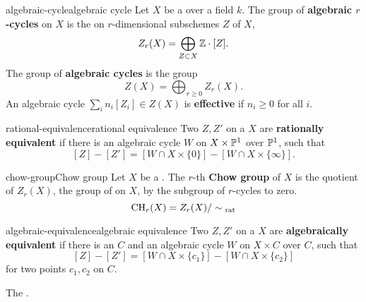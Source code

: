 \begin{topic}{algebraic-cycle}{algebraic cycle}
    Let $X$ be a  over a field $k$. The group of \textbf{algebraic $r$-cycles} on $X$ is the  on $r$-dimensional   subschemes $Z$ of $X$,
    \[ Z_r(X) = \bigoplus_{Z \subset X} \mathbb{Z} \cdot [Z] . \]
    The group of \textbf{algebraic cycles} is the  group
    \[ Z(X) = \bigoplus_{r \ge 0} Z_r(X) . \]
    An algebraic cycle $\sum_i n_i [Z_i] \in Z(X)$ is \textbf{effective} if $n_i \ge 0$ for all $i$.
\end{topic}

\begin{topic}{rational-equivalence}{rational equivalence}
    Two  $Z, Z'$ on a  $X$ are \textbf{rationally equivalent} if there is an algebraic cycle $W$ on $X \times \mathbb{P}^1$  over $\mathbb{P}^1$, such that
    \[ [Z] - [Z'] = [W \cap X \times \{ 0 \}] - [W \cap X \times \{ \infty \}] . \]
\end{topic}

\begin{topic}{chow-group}{Chow group}
    Let $X$ be a . The $r$-th \textbf{Chow group} of $X$ is the quotient of $Z_r(X)$, the group of  on $X$, by the subgroup of $r$-cycles  to zero.
    \[ \textup{CH}_r(X) = Z_r(X) / \sim{}_\textup{rat} \]
\end{topic}

\begin{topic}{algebraic-equivalence}{algebraic equivalence}
    Two  $Z, Z'$ on a  $X$ are \textbf{algebraically equivalent} if there is an  $C$ and an algebraic cycle $W$ on $X \times C$  over $C$, such that
    \[ [Z] - [Z'] = [W \cap X \times \{ c_1 \}] - [W \cap X \times \{ c_2 \}] \]
    for two points $c_1, c_2$ on $C$.
    
    The .
\end{topic}

